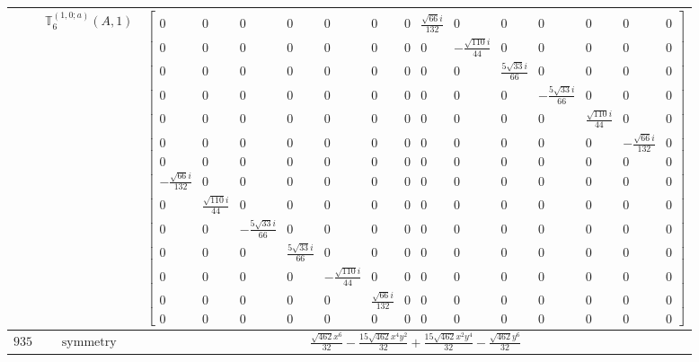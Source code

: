 \documentclass[fleqn,8pt,landscape]{jsarticle}
\begin{document}
\begin{longtable}{ccc}
$  $ & $ \mathbb{T}_{6}^{(1,0;a)}(A,1) $ & $ \begin{bmatrix} 0 & 0 & 0 & 0 & 0 & 0 & 0 & \frac{\sqrt{66} i}{132} & 0 & 0 & 0 & 0 & 0 & 0 \\ 0 & 0 & 0 & 0 & 0 & 0 & 0 & 0 & - \frac{\sqrt{110} i}{44} & 0 & 0 & 0 & 0 & 0 \\ 0 & 0 & 0 & 0 & 0 & 0 & 0 & 0 & 0 & \frac{5 \sqrt{33} i}{66} & 0 & 0 & 0 & 0 \\ 0 & 0 & 0 & 0 & 0 & 0 & 0 & 0 & 0 & 0 & - \frac{5 \sqrt{33} i}{66} & 0 & 0 & 0 \\ 0 & 0 & 0 & 0 & 0 & 0 & 0 & 0 & 0 & 0 & 0 & \frac{\sqrt{110} i}{44} & 0 & 0 \\ 0 & 0 & 0 & 0 & 0 & 0 & 0 & 0 & 0 & 0 & 0 & 0 & - \frac{\sqrt{66} i}{132} & 0 \\ 0 & 0 & 0 & 0 & 0 & 0 & 0 & 0 & 0 & 0 & 0 & 0 & 0 & 0 \\ - \frac{\sqrt{66} i}{132} & 0 & 0 & 0 & 0 & 0 & 0 & 0 & 0 & 0 & 0 & 0 & 0 & 0 \\ 0 & \frac{\sqrt{110} i}{44} & 0 & 0 & 0 & 0 & 0 & 0 & 0 & 0 & 0 & 0 & 0 & 0 \\ 0 & 0 & - \frac{5 \sqrt{33} i}{66} & 0 & 0 & 0 & 0 & 0 & 0 & 0 & 0 & 0 & 0 & 0 \\ 0 & 0 & 0 & \frac{5 \sqrt{33} i}{66} & 0 & 0 & 0 & 0 & 0 & 0 & 0 & 0 & 0 & 0 \\ 0 & 0 & 0 & 0 & - \frac{\sqrt{110} i}{44} & 0 & 0 & 0 & 0 & 0 & 0 & 0 & 0 & 0 \\ 0 & 0 & 0 & 0 & 0 & \frac{\sqrt{66} i}{132} & 0 & 0 & 0 & 0 & 0 & 0 & 0 & 0 \\ 0 & 0 & 0 & 0 & 0 & 0 & 0 & 0 & 0 & 0 & 0 & 0 & 0 & 0 \end{bmatrix} $ \\ \hline
$ 935 $ & $ \text{symmetry} $ & $ \frac{\sqrt{462} x^{6}}{32} - \frac{15 \sqrt{462} x^{4} y^{2}}{32} + \frac{15 \sqrt{462} x^{2} y^{4}}{32} - \frac{\sqrt{462} y^{6}}{32} $ \\

\end{longtable}
\end{document}
